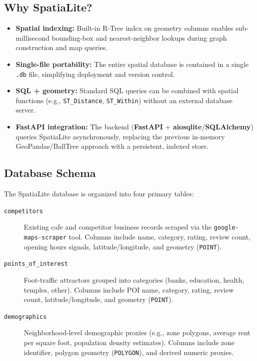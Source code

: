 \subsection{Why SpatiaLite?}
\begin{itemize}
	\item \textbf{Spatial indexing:} Built-in R-Tree index on geometry columns enables sub-millisecond bounding-box and nearest-neighbor lookups during graph construction and map queries.
	\item \textbf{Single-file portability:} The entire spatial database is contained in a single \texttt{.db} file, simplifying deployment and version control.
	\item \textbf{SQL + geometry:} Standard SQL queries can be combined with spatial functions (e.g., \texttt{ST\_Distance}, \texttt{ST\_Within}) without an external database server.
	\item \textbf{FastAPI integration:} The backend (\textbf{FastAPI} + \textbf{aiosqlite}/\textbf{SQLAlchemy}) queries SpatiaLite asynchronously, replacing the previous in-memory GeoPandas/BallTree approach with a persistent, indexed store.
\end{itemize}

\subsection{Database Schema}
The SpatiaLite database is organized into four primary tables:
\begin{description}

    \item[\texttt{competitors}] Existing cafe and competitor business records scraped via the \texttt{google\allowbreak-\allowbreak maps\allowbreak-\allowbreak scraper} tool. Columns include name, category, rating, review count, opening hours signals, latitude/longitude, and geometry (\texttt{POINT}).
    \item[\texttt{points\_of\_interest}] Foot-traffic attractors grouped into categories (banks, education, health, temples, other). Columns include POI name, category, rating, review count, latitude/longitude, and geometry (\texttt{POINT}).
    \item[\texttt{demographics}] Neighborhood-level demographic proxies (e.g., zone polygons, average rent per square foot, population density estimates). Columns include zone identifier, polygon geometry (\texttt{POLYGON}), and derived numeric proxies.
\end{description}

